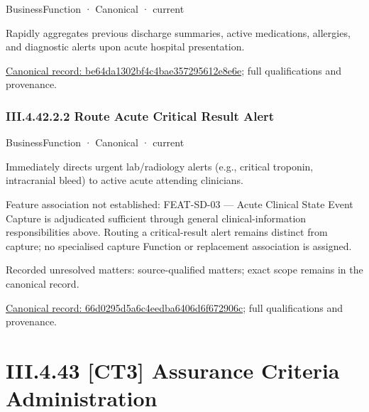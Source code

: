 \label{element:be64da1302bf4c4bae357295612e8e6e}
{\small BusinessFunction · Canonical · current}\par

Rapidly aggregates previous discharge summaries, active medications, allergies, and diagnostic alerts upon acute hospital presentation.


{\footnotesize \href{../../../../continuum/business/business-function/be64da1302bf4c4bae357295612e8e6e.md}{Canonical record: be64da1302bf4c4bae357295612e8e6e}; full qualifications and provenance.}\par
\subsubsection*{III.4.42.2.2 Route Acute Critical Result Alert}
\label{navigation:III.4.42.2.2}

\label{element:66d0295d5a6c4eedba6406d6f672906c}
{\small BusinessFunction · Canonical · current}\par

Immediately directs urgent lab/radiology alerts (e.g., critical troponin, intracranial bleed) to active acute attending clinicians.



Feature association not established: FEAT-SD-03 — Acute Clinical State Event Capture is adjudicated sufficient through general clinical-information responsibilities above. Routing a critical-result alert remains distinct from capture; no specialised capture Function or replacement association is assigned.


{\small Recorded unresolved matters: source-qualified matters; exact scope remains in the canonical record.}\par
{\footnotesize \href{../../../../continuum/business/business-function/66d0295d5a6c4eedba6406d6f672906c.md}{Canonical record: 66d0295d5a6c4eedba6406d6f672906c}; full qualifications and provenance.}\par
\section*{III.4.43 [CT3] Assurance Criteria Administration}
\label{navigation:III.4.43}

